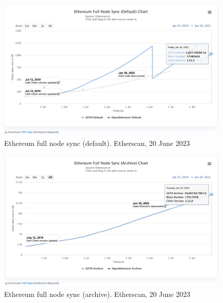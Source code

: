 \documentclass[UTF8]{article}
\begin{document}

\begin{figure}[htbp]
\begin{center}
\includegraphics[width=0.9\linewidth]{images/ethsync}
\caption{Ethereum full node sync (default). Etherscan, 20 June 2023}
\label{fig:ethsync}
\end{center}
\end{figure}

\begin{figure}[htbp]
\begin{center}
\includegraphics[width=0.9\linewidth]{images/etharch}
\caption{Ethereum full node sync (archive). Etherscan, 20 June 2023}
\label{fig:etharch}
\end{center}
\end{figure}
\end{document}
